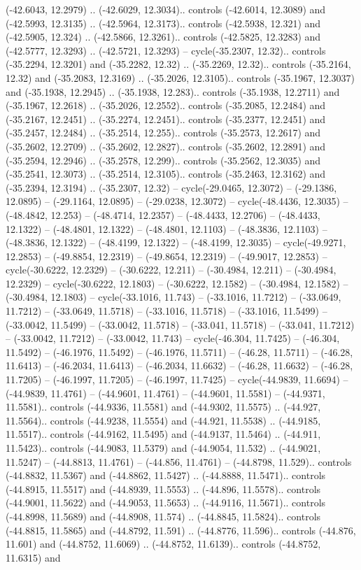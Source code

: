 \begin{scope}[shift={(2.5552, 9.9912)}]
\begin{scope}[shift={(48.1654, -14.8546)}]
(-42.6043, 12.2979) .. (-42.6029, 12.3034).. controls (-42.6014, 12.3089) and (-42.5993, 12.3135) .. (-42.5964, 12.3173).. controls (-42.5938, 12.321) and (-42.5905, 12.324) .. (-42.5866, 12.3261).. controls (-42.5825, 12.3283) and (-42.5777, 12.3293) .. (-42.5721, 12.3293) -- cycle(-35.2307, 12.32).. controls (-35.2294, 12.3201) and (-35.2282, 12.32) .. (-35.2269, 12.32).. controls (-35.2164, 12.32) and (-35.2083, 12.3169) .. (-35.2026, 12.3105).. controls (-35.1967, 12.3037) and (-35.1938, 12.2945) .. (-35.1938, 12.283).. controls (-35.1938, 12.2711) and (-35.1967, 12.2618) .. (-35.2026, 12.2552).. controls (-35.2085, 12.2484) and (-35.2167, 12.2451) .. (-35.2274, 12.2451).. controls (-35.2377, 12.2451) and (-35.2457, 12.2484) .. (-35.2514, 12.255).. controls (-35.2573, 12.2617) and (-35.2602, 12.2709) .. (-35.2602, 12.2827).. controls (-35.2602, 12.2891) and (-35.2594, 12.2946) .. (-35.2578, 12.299).. controls (-35.2562, 12.3035) and (-35.2541, 12.3073) .. (-35.2514, 12.3105).. controls (-35.2463, 12.3162) and (-35.2394, 12.3194) .. (-35.2307, 12.32) -- cycle(-29.0465, 12.3072) -- (-29.1386, 12.0895) -- (-29.1164, 12.0895) -- (-29.0238, 12.3072) -- cycle(-48.4436, 12.3035) -- (-48.4842, 12.253) -- (-48.4714, 12.2357) -- (-48.4433, 12.2706) -- (-48.4433, 12.1322) -- (-48.4801, 12.1322) -- (-48.4801, 12.1103) -- (-48.3836, 12.1103) -- (-48.3836, 12.1322) -- (-48.4199, 12.1322) -- (-48.4199, 12.3035) -- cycle(-49.9271, 12.2853) -- (-49.8854, 12.2319) -- (-49.8654, 12.2319) -- (-49.9017, 12.2853) -- cycle(-30.6222, 12.2329) -- (-30.6222, 12.211) -- (-30.4984, 12.211) -- (-30.4984, 12.2329) -- cycle(-30.6222, 12.1803) -- (-30.6222, 12.1582) -- (-30.4984, 12.1582) -- (-30.4984, 12.1803) -- cycle(-33.1016, 11.743) -- (-33.1016, 11.7212) -- (-33.0649, 11.7212) -- (-33.0649, 11.5718) -- (-33.1016, 11.5718) -- (-33.1016, 11.5499) -- (-33.0042, 11.5499) -- (-33.0042, 11.5718) -- (-33.041, 11.5718) -- (-33.041, 11.7212) -- (-33.0042, 11.7212) -- (-33.0042, 11.743) -- cycle(-46.304, 11.7425) -- (-46.304, 11.5492) -- (-46.1976, 11.5492) -- (-46.1976, 11.5711) -- (-46.28, 11.5711) -- (-46.28, 11.6413) -- (-46.2034, 11.6413) -- (-46.2034, 11.6632) -- (-46.28, 11.6632) -- (-46.28, 11.7205) -- (-46.1997, 11.7205) -- (-46.1997, 11.7425) -- cycle(-44.9839, 11.6694) -- (-44.9839, 11.4761) -- (-44.9601, 11.4761) -- (-44.9601, 11.5581) -- (-44.9371, 11.5581).. controls (-44.9336, 11.5581) and (-44.9302, 11.5575) .. (-44.927, 11.5564).. controls (-44.9238, 11.5554) and (-44.921, 11.5538) .. (-44.9185, 11.5517).. controls (-44.9162, 11.5495) and (-44.9137, 11.5464) .. (-44.911, 11.5423).. controls (-44.9083, 11.5379) and (-44.9054, 11.532) .. (-44.9021, 11.5247) -- (-44.8813, 11.4761) -- (-44.856, 11.4761) -- (-44.8798, 11.529).. controls (-44.8832, 11.5367) and (-44.8862, 11.5427) .. (-44.8888, 11.5471).. controls (-44.8915, 11.5517) and (-44.8939, 11.5553) .. (-44.896, 11.5578).. controls (-44.9001, 11.5622) and (-44.9053, 11.5653) .. (-44.9116, 11.5671).. controls (-44.8998, 11.5689) and (-44.8908, 11.574) .. (-44.8845, 11.5824).. controls (-44.8815, 11.5865) and (-44.8792, 11.591) .. (-44.8776, 11.596).. controls (-44.876, 11.601) and (-44.8752, 11.6069) .. (-44.8752, 11.6139).. controls (-44.8752, 11.6315) and 
\end{scope}
\end{scope}
